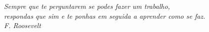 % 
%

\vspace*{\fill}

{ \raggedleft


\textit{Sempre que te perguntarem se podes fazer um trabalho, \\
respondas que sim e te ponhas em seguida a aprender como se faz. \\
F. Roosevelt}

~
}